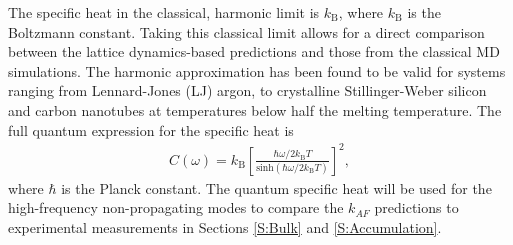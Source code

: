 \documentclass[aps,prb,onecolumn,preprint,superscriptaddress,footinbib,amsmath,amssymb,floatfix]{revtex4}
\begin{document}
The specific heat in the classical, harmonic limit is 
$k_{\text{B}}$, where $k_{\text{B}}$ is the Boltzmann constant.
\cite{mcquarrie_statistical_2000}
Taking this classical limit allows for a direct 
comparison between the lattice dynamics-based 
predictions and those from the classical MD simulations. 
The harmonic approximation has been found to be valid 
for systems ranging from 
Lennard-Jones (LJ) argon,\cite{mcgaughey_quantitative_2004} 
to crystalline Stillinger-Weber silicon 
and carbon nanotubes\cite{larkin_comparison_2012} at temperatures 
below half the melting temperature. 
The full quantum expression for the specific heat is
\cite{ziman_electrons_2001}
\begin{equation}\label{EQ:Cquantum}
\begin{split}
C(\omega) = k_{\text{B}}\left[\frac{\hbar\omega/2k_{\text{B}}T}
{\text{sinh}(\hbar\omega/2k_{\text{B}}T)}\right]^2,
\end{split}
\end{equation} 
where $\hbar$ is the Planck constant.\cite{ashcroft_solid_1976} 
The quantum specific heat will be used for the high-frequency 
non-propagating modes to compare the $k_{AF}$ predictions 
to experimental measurements in Sections \ref{S:Bulk} 
and \ref{S:Accumulation}. 
\end{document}
